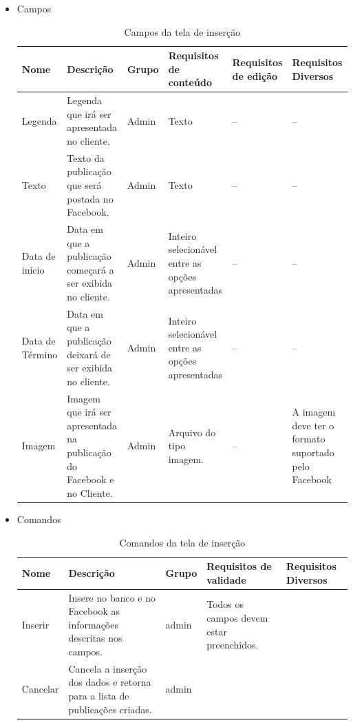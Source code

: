 \begin{itemize}
        \item Campos
        \begin{table}[H]
            \caption{Campos da tela de inserção}
                \begin{tabular}{|p{1.5cm}|p{3cm}|p{1.1cm}|p{3cm}|p{2.2cm}|p{2.5cm}|}
                \hline
Nome & Descrição & Grupo & Requisitos de conteúdo & Requisitos de edição & Requisitos Diversos \\ \hline
Legenda & Legenda que irá ser apresentada no cliente. & Admin & Texto & -- & -- \\ \hline
Texto & Texto da publicação que será postada no Facebook. & Admin & Texto & -- & -- \\ \hline
Data de início & Data em que a publicação começará a ser exibida no cliente. & Admin & Inteiro selecionável entre as opções apresentadas & -- & -- \\ \hline
Data de Término & Data em que a publicação deixará de ser exibida no cliente. & Admin & Inteiro selecionável entre as opções apresentadas & -- & -- \\ \hline
Imagem & Imagem que irá ser apresentada na publicação do Facebook e no Cliente. & Admin & Arquivo do tipo imagem. & -- & A imagem deve ter o formato suportado pelo Facebook \\ \hline
                \end{tabular}
            \end{table}
        \item Comandos
            \begin{table}[H]
                \caption{Comandos da tela de inserção}
                \begin{tabular}{|p{2cm}|p{4.7cm}|p{1.1cm}|p{3.9cm}|p{2cm}|}
                \hline
Nome & Descrição & Grupo & Requisitos de validade & Requisitos Diversos \\ \hline
Inserir & Insere no banco e no Facebook as informações descritas nos campos. & admin & Todos os campos devem estar preenchidos. &  \\ \hline
Cancelar & Cancela a inserção dos dados e retorna para a lista de publicações criadas. & admin &  &  \\ \hline
                \end{tabular}%
            \end{table}
    \end{itemize}
        
